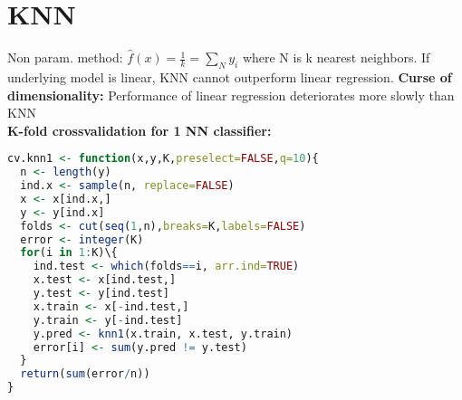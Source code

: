 \section{KNN}
Non param. method: $\hat f(x) = \frac{1}{k} = \sum_N y_i$ where N is k nearest neighbors. If underlying model is linear, KNN cannot outperform linear regression.
\textbf{Curse of dimensionality: } Performance of linear regression deteriorates more slowly than KNN \\
\textbf{K-fold crossvalidation for 1 NN classifier: }
\begin{lstlisting}[language = R]
cv.knn1 <- function(x,y,K,preselect=FALSE,q=10){
  n <- length(y)
  ind.x <- sample(n, replace=FALSE)
  x <- x[ind.x,]
  y <- y[ind.x]
  folds <- cut(seq(1,n),breaks=K,labels=FALSE)
  error <- integer(K)
  for(i in 1:K)\{
    ind.test <- which(folds==i, arr.ind=TRUE)
    x.test <- x[ind.test,]
    y.test <- y[ind.test]
    x.train <- x[-ind.test,]
    y.train <- y[-ind.test]
    y.pred <- knn1(x.train, x.test, y.train)  
    error[i] <- sum(y.pred != y.test)
  }
  return(sum(error/n))
}
\end{lstlisting}